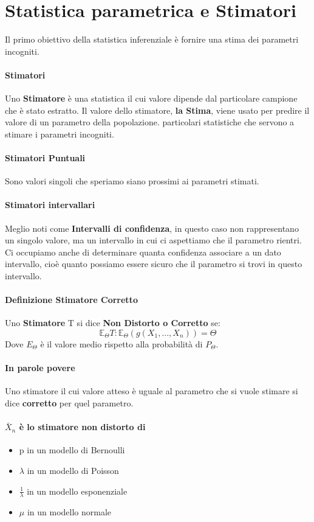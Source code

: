 \documentclass[12pt, a4paper, openany]{book}
\begin{document}
\section{Statistica parametrica e Stimatori} 
Il primo obiettivo della statistica inferenziale è fornire una stima dei
parametri incogniti.   
\paragraph*{Stimatori} Uno \textbf{Stimatore} è una statistica il cui valore
dipende dal particolare campione che è stato estratto. Il valore dello stimatore,
\textbf{la Stima}, viene usato per predire il valore di un parametro della popolazione.
particolari statistiche che servono a stimare i parametri incogniti.
\paragraph*{Stimatori Puntuali} Sono valori singoli che speriamo siano prossimi
ai parametri stimati.
\paragraph*{Stimatori intervallari} Meglio noti come \textbf{Intervalli di confidenza},
in questo caso non rappresentano un singolo valore, ma un intervallo in cui ci
aspettiamo che il parametro rientri. Ci occupiamo anche di determinare quanta
confidenza associare a un dato intervallo, cioè quanto possiamo essere sicuro che il parametro
si trovi in questo intervallo.
\paragraph*{Definizione Stimatore Corretto} Uno \textbf{Stimatore} T si dice \textbf{Non Distorto o Corretto}
se:
\begin{equation*}
    \mathbb{E}_\Theta{T}: \mathbb{E}_\Theta(g(X_1, ..., X_n)) = \Theta
\end{equation*}
Dove $E_\Theta$ è il valore medio rispetto alla probabilità di $P_\Theta$.
\paragraph*{In parole povere} Uno stimatore il cui valore atteso è uguale al parametro
che si vuole stimare si dice \textbf{corretto} per quel parametro.
\paragraph*{$\bar{X}_n$ è lo stimatore non distorto di}
\begin{itemize}
    \item p in un modello di Bernoulli
    \item $\lambda$ in un modello di Poisson
    \item $\frac{1}{\lambda}$ in un modello esponenziale
    \item $\mu$ in un modello normale
\end{itemize}
\end{document}
